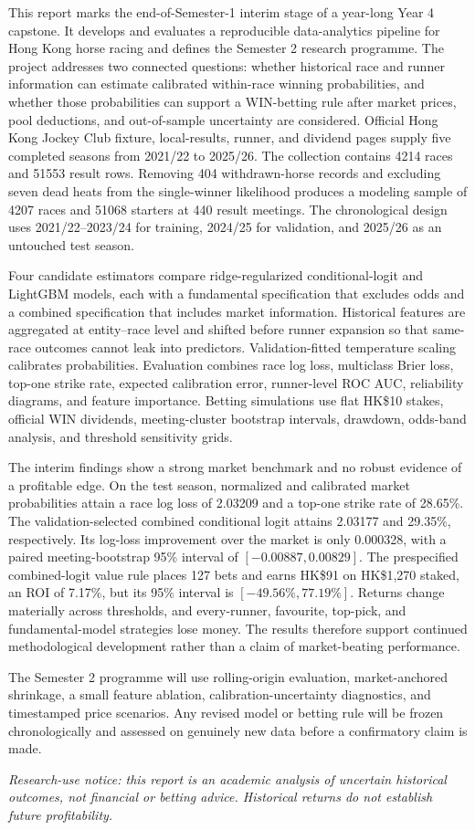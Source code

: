 This report marks the end-of-Semester-1 interim stage of a year-long Year 4 capstone. It develops and evaluates a reproducible data-analytics pipeline for Hong Kong horse racing and defines the Semester 2 research programme. The project addresses two connected questions: whether historical race and runner information can estimate calibrated within-race winning probabilities, and whether those probabilities can support a WIN-betting rule after market prices, pool deductions, and out-of-sample uncertainty are considered. Official Hong Kong Jockey Club fixture, local-results, runner, and dividend pages supply five completed seasons from 2021/22 to 2025/26. The collection contains \num{4214} races and \num{51553} result rows. Removing 404 withdrawn-horse records and excluding seven dead heats from the single-winner likelihood produces a modeling sample of \num{4207} races and \num{51068} starters at 440 result meetings. The chronological design uses 2021/22--2023/24 for training, 2024/25 for validation, and 2025/26 as an untouched test season.

Four candidate estimators compare ridge-regularized conditional-logit and LightGBM models, each with a fundamental specification that excludes odds and a combined specification that includes market information. Historical features are aggregated at entity--race level and shifted before runner expansion so that same-race outcomes cannot leak into predictors. Validation-fitted temperature scaling calibrates probabilities. Evaluation combines race log loss, multiclass Brier loss, top-one strike rate, expected calibration error, runner-level ROC AUC, reliability diagrams, and feature importance. Betting simulations use flat HK\$10 stakes, official WIN dividends, meeting-cluster bootstrap intervals, drawdown, odds-band analysis, and threshold sensitivity grids.

The interim findings show a strong market benchmark and no robust evidence of a profitable edge. On the test season, normalized and calibrated market probabilities attain a race log loss of 2.03209 and a top-one strike rate of 28.65\%. The validation-selected combined conditional logit attains 2.03177 and 29.35\%, respectively. Its log-loss improvement over the market is only 0.000328, with a paired meeting-bootstrap 95\% interval of $[-0.00887,0.00829]$. The prespecified combined-logit value rule places 127 bets and earns HK\$91 on HK\$1,270 staked, an ROI of 7.17\%, but its 95\% interval is $[-49.56\%,77.19\%]$. Returns change materially across thresholds, and every-runner, favourite, top-pick, and fundamental-model strategies lose money. The results therefore support continued methodological development rather than a claim of market-beating performance.

The Semester 2 programme will use rolling-origin evaluation, market-anchored shrinkage, a small feature ablation, calibration-uncertainty diagnostics, and timestamped price scenarios. Any revised model or betting rule will be frozen chronologically and assessed on genuinely new data before a confirmatory claim is made.

{\footnotesize\emph{Research-use notice: this report is an academic analysis of uncertain historical outcomes, not financial or betting advice. Historical returns do not establish future profitability.}}
